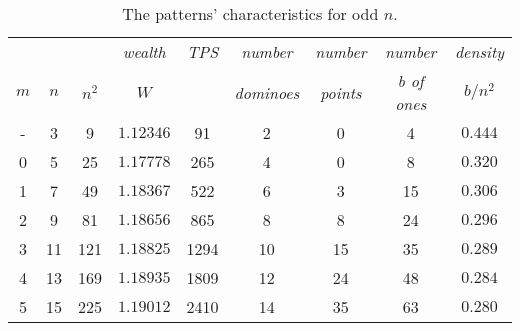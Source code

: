 \documentclass[10pt,a4paper]{article}  %
\begin{document}
\begin{table}[H] 
	\caption{
The patterns' characteristics for odd $n$.}	
\begin{center}
	\begin{tabular}{ccccccccc}
  

   &     &   & \textit{wealth} &\textit{TPS} & \textit{number} & \textit{number} & \textit{number}   & \textit{density}            \\
$m$ & $n$  & $n^2$ & $W$         &         & \textit{dominoes} & \textit{points}       & \textit{b of ones}  & $b/n^2$  \\				
				
\hline		   
-   & 3    &    9      &$     1.12346  $&  91   &  2      &   0      &    4  &$    0.444 $\\
0   & 5	   &	 	25	   &$     1.17778  $&  265  &  4      &   0      &    8  &$    0.320 $\\
1   & 7	   &    49     &$     1.18367  $&  522  &  6      &   3      &    15 &$    0.306 $\\
2   & 9    &    81     &$     1.18656  $&  865  &  8      &   8      &    24 &$    0.296 $\\
3   & 11   &    121    &$     1.18825  $&  1294 &  10     &   15     &    35 &$    0.289 $\\
4   & 13   &    169    &$     1.18935  $&  1809 &  12     &   24     &    48 &$    0.284 $\\ 
5   & 15   &    225    &$     1.19012  $&  2410 &  14     &   35     &    63 &$    0.280 $\\



  \end{tabular}
\end{center}
\label{TableDataOdd}
\end{table} 
\end{document}
